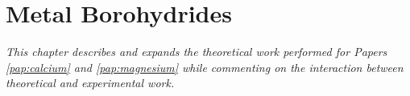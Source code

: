 \chapter{Metal Borohydrides}
\label{chap:borohydrides}
\textit{This chapter describes and expands the theoretical work performed for Papers \ref{pap:calcium} and \ref{pap:magnesium} while commenting on the interaction between theoretical and experimental work.}


%




